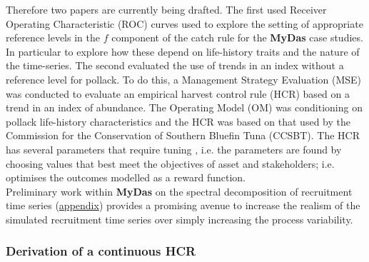 Therefore two papers are currently being drafted. The first used Receiver Operating Characteristic (ROC) curves used to explore the setting of appropriate reference levels in the $f$ component of the catch rule for the \textbf{MyDas} case studies. In particular to explore how these depend on life-history traits and the nature of the time-series. The second evaluated the use of trends in an index without a reference level for pollack. To do this, a Management Strategy Evaluation (MSE) was conducted to evaluate an empirical harvest control rule (HCR) based on a trend in an index of
abundance. The Operating Model (OM) was conditioning on pollack life-history characteristics and the HCR was based on that used by the Commission for the Conservation of Southern Bluefin Tuna (CCSBT). The HCR has several parameters that require tuning \citep{hillary2015scientific}, i.e. the parameters are found by choosing values that best meet the objectives of asset and stakeholders; i.e. optimises the outcomes modelled as a reward function.\\
Preliminary work within {\bf{MyDas}} on the spectral decomposition of recruitment time series (\hyperref[appendix:spectral]{appendix}) provides a promising avenue to increase the realism of the simulated recruitment time series over simply increasing the process variability. 

\subsubsection*{Derivation of a continuous HCR}



